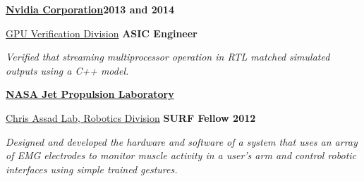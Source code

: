 \documentclass[10pt]{article}
\newenvironment{innerlist}[1][\enskip\textbullet]%
        {\begin{compactitem}[#1]}{\end{compactitem}}
\begin{document}
\textbf{\href{http://www.nvidia.com/}{Nvidia Corporation}}\hfill \textbf{2013 and 2014}
	\begin{innerlist}
		\item[] \href{http://www.geforce.com/hardware}{GPU Verification Division} \hfill \textbf{ASIC Engineer}
	\begin{innerlist}
	        \item[] \emph{Verified that streaming multiprocessor operation in RTL matched simulated outputs using a C++ model.}
	    \end{innerlist}
	\end{innerlist}

\textbf{\href{http://www.jpl.nasa.gov/}{NASA Jet Propulsion Laboratory}}
	\begin{innerlist}
		\item[] \href{https://www-robotics.jpl.nasa.gov/}{Chris Assad Lab, Robotics Division} \hfill \hfill \textbf{SURF Fellow 2012}
	    \begin{innerlist}
	        \item[] \emph{Designed and developed the hardware and software of a system that uses an array of EMG electrodes to monitor muscle activity in a user's arm and control robotic interfaces using simple trained gestures.}
	    \end{innerlist}
	\end{innerlist}
\end{document}
